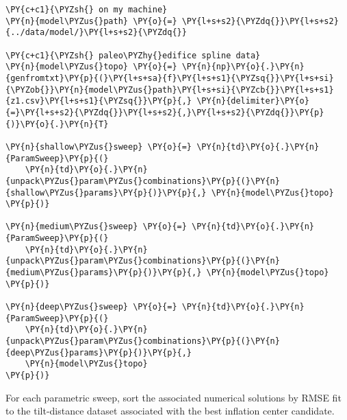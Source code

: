     \begin{tcolorbox}[breakable, size=fbox, boxrule=1pt, pad at break*=1mm,colback=cellbackground, colframe=cellborder]
\begin{Verbatim}[commandchars=\\\{\}]
\PY{c+c1}{\PYZsh{} on my machine}
\PY{n}{model\PYZus{}path} \PY{o}{=} \PY{l+s+s2}{\PYZdq{}}\PY{l+s+s2}{../data/model/}\PY{l+s+s2}{\PYZdq{}}

\PY{c+c1}{\PYZsh{} paleo\PYZhy{}edifice spline data}
\PY{n}{model\PYZus{}topo} \PY{o}{=} \PY{n}{np}\PY{o}{.}\PY{n}{genfromtxt}\PY{p}{(}\PY{l+s+sa}{f}\PY{l+s+s1}{\PYZsq{}}\PY{l+s+si}{\PYZob{}}\PY{n}{model\PYZus{}path}\PY{l+s+si}{\PYZcb{}}\PY{l+s+s1}{z1.csv}\PY{l+s+s1}{\PYZsq{}}\PY{p}{,} \PY{n}{delimiter}\PY{o}{=}\PY{l+s+s2}{\PYZdq{}}\PY{l+s+s2}{,}\PY{l+s+s2}{\PYZdq{}}\PY{p}{)}\PY{o}{.}\PY{n}{T}

\PY{n}{shallow\PYZus{}sweep} \PY{o}{=} \PY{n}{td}\PY{o}{.}\PY{n}{ParamSweep}\PY{p}{(}
    \PY{n}{td}\PY{o}{.}\PY{n}{unpack\PYZus{}param\PYZus{}combinations}\PY{p}{(}\PY{n}{shallow\PYZus{}params}\PY{p}{)}\PY{p}{,} \PY{n}{model\PYZus{}topo}
\PY{p}{)}

\PY{n}{medium\PYZus{}sweep} \PY{o}{=} \PY{n}{td}\PY{o}{.}\PY{n}{ParamSweep}\PY{p}{(}
    \PY{n}{td}\PY{o}{.}\PY{n}{unpack\PYZus{}param\PYZus{}combinations}\PY{p}{(}\PY{n}{medium\PYZus{}params}\PY{p}{)}\PY{p}{,} \PY{n}{model\PYZus{}topo}
\PY{p}{)}

\PY{n}{deep\PYZus{}sweep} \PY{o}{=} \PY{n}{td}\PY{o}{.}\PY{n}{ParamSweep}\PY{p}{(}
    \PY{n}{td}\PY{o}{.}\PY{n}{unpack\PYZus{}param\PYZus{}combinations}\PY{p}{(}\PY{n}{deep\PYZus{}params}\PY{p}{)}\PY{p}{,}
    \PY{n}{model\PYZus{}topo}
\PY{p}{)}
\end{Verbatim}
\end{tcolorbox}

    For each parametric sweep, sort the associated numerical solutions by
RMSE fit to the tilt-distance dataset associated with the best inflation
center candidate.

